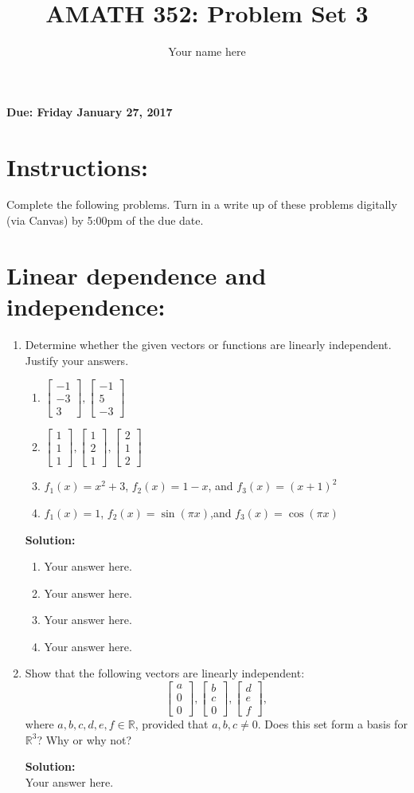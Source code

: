 \documentclass[]{article}
\title{AMATH 352: Problem Set 3}
\author{Your name here}
\newcommand{\R}{\mathbb{R}}				%
\newcommand{\bbm}{\begin{bmatrix}}		%
\newcommand{\ebm}{\end{bmatrix}}		%
\newcommand{\solution}{\vskip 0.5cm \textbf{\large Solution:} \\}
\begin{document}
\maketitle
{\Large \textbf{Due: Friday January 27, 2017}}


\section*{Instructions:} Complete the following problems. Turn in a write up of these problems digitally (via Canvas) by 5:00pm of the due date.

\hrulefill

\vskip 1cm

\section*{Linear dependence and independence:}
\begin{enumerate}[resume]
	\item Determine whether the given vectors or functions are linearly independent. Justify your answers.
	\begin{enumerate}
		\item $\bbm -1\\-3\\3 \ebm, \bbm -1\\5\\-3 \ebm$
		\item $\bbm 1\\1\\1 \ebm, \bbm 1\\2\\1 \ebm, \bbm 2\\1\\2 \ebm$
		\item $f_1(x)=x^2+3$, $f_2(x) = 1-x$, and $f_3(x) = (x+1)^2$
		\item $f_1(x)=1$, $f_2(x)=\sin(\pi x)$,and $f_3(x)=\cos(\pi x)$

	\end{enumerate}

	\solution
	\begin{enumerate}
		\item Your answer here.
		\item Your answer here.
		\item Your answer here.
		\item Your answer here.
	\end{enumerate}

	\item Show that the following vectors are linearly independent:
	\[
		\bbm a\\0\\0\ebm,\bbm b\\c\\0\ebm,\bbm d\\e\\f\ebm,
	\]
	where $a,b,c,d,e,f\in\R$, provided that $a,b,c\neq 0$. Does this set form a basis for $\R^3$? Why or why not?

	\solution
	Your answer here.

\end{enumerate}
\end{document}
